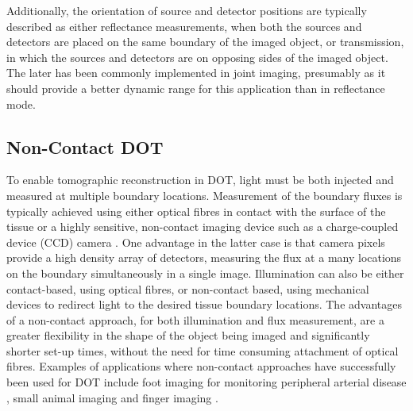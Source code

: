 \documentclass[twoside]{bhamthesis}
\theoremstyle{definition}
\begin{document}
Additionally, the orientation of source and detector positions are typically described as either reflectance measurements, when both the sources and detectors are placed on the same boundary of the imaged object, or transmission, in which the sources and detectors are on opposing sides of the imaged object. The later has been commonly implemented in joint imaging, presumably as it should provide a better dynamic range for this application than in reflectance mode.

\subsection{Non-Contact DOT}
\label{section:Non-Contact DOT}
To enable tomographic reconstruction in DOT, light must be both injected and measured at multiple boundary locations. Measurement of the boundary fluxes is typically achieved using either optical fibres in contact with the surface of the tissue \cite{eggebrecht2014mapping} or a highly sensitive, non-contact imaging device such as a charge-coupled device (CCD) camera \cite{hielscher2004sagittal}. One advantage in the latter case is that camera pixels provide a high density array of detectors, measuring the flux at a many locations on the boundary simultaneously in a single image. Illumination can also be either contact-based, using optical fibres, or non-contact based, using mechanical devices to redirect light to the desired tissue boundary locations. 
The advantages of a non-contact approach, for both illumination and flux measurement, are a greater flexibility in the shape of the object being imaged and significantly shorter set-up times, without the need for time consuming attachment of optical fibres. Examples of applications where non-contact approaches have successfully been used for DOT include foot imaging for monitoring peripheral arterial disease \cite{hoi2018non}, small animal imaging \cite{guggenheim2013multi,reisman2017structured} and finger imaging \cite{hielscher2004sagittal}.
\end{document}
